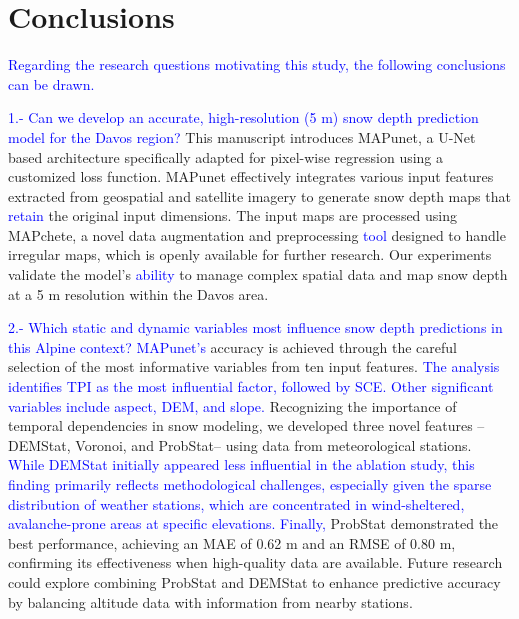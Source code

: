 \documentclass[preprint,12pt]{elsarticle}
\begin{document}
\section{Conclusions} \label{Sec:discussion}

\textcolor{blue}{Regarding the research questions motivating this study, the following conclusions can be drawn.}

\textcolor{blue}{1.- Can we develop an accurate, high-resolution (5 m) snow depth prediction model for the Davos region?}
This manuscript introduces MAPunet, a U-Net based architecture specifically adapted for pixel-wise regression using a customized loss function. MAPunet effectively integrates various input features extracted from geospatial and satellite imagery to generate snow depth maps that \textcolor{blue}{retain} the original input dimensions. The input maps are processed using MAPchete, a novel data augmentation and preprocessing \textcolor{blue}{tool} designed to handle irregular maps, which is openly available for further research. Our experiments validate the model’s \textcolor{blue}{ability} to manage complex spatial data and map snow depth at a 5 m resolution within the Davos area. 

\textcolor{blue}{
2.- Which static and dynamic variables most influence snow depth predictions in this Alpine context? MAPunet's} accuracy is achieved through the careful selection of the most informative variables from ten input features. \textcolor{blue}{The analysis identifies TPI as the most influential factor, followed by SCE. Other significant variables include aspect, DEM, and slope.} Recognizing the importance of temporal dependencies in snow modeling, we developed three novel features --DEMStat, Voronoi, and ProbStat-- using data from meteorological stations. \textcolor{blue}{While DEMStat initially appeared less influential in the ablation study, this finding primarily reflects methodological challenges, especially given the sparse distribution of weather stations, which are concentrated in wind-sheltered, avalanche-prone areas at specific elevations. Finally,} ProbStat demonstrated the best performance, achieving an MAE of 0.62 m and an RMSE of 0.80 m, confirming its effectiveness when high-quality data are available. Future research could explore combining ProbStat and DEMStat to enhance predictive accuracy by balancing altitude data with information from nearby stations.
\end{document}
